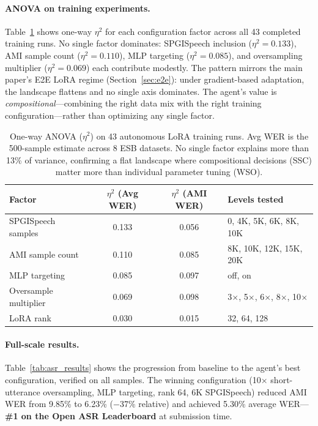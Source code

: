 \documentclass{article}
\begin{document}
\paragraph{ANOVA on training experiments.}
Table~\ref{tab:asr_anova} shows one-way $\eta^2$ for each configuration factor across all 43 completed training runs.
No single factor dominates: SPGISpeech inclusion ($\eta^2 = 0.133$), AMI sample count ($\eta^2 = 0.110$), MLP targeting ($\eta^2 = 0.085$), and oversampling multiplier ($\eta^2 = 0.069$) each contribute modestly.
The pattern mirrors the main paper's E2E LoRA regime (Section~\ref{sec:e2e}): under gradient-based adaptation, the landscape flattens and no single axis dominates.
The agent's value is \emph{compositional}---combining the right data mix with the right training configuration---rather than optimizing any single factor.

\begin{table}[ht]
\centering
\caption{One-way ANOVA ($\eta^2$) on 43 autonomous LoRA training runs. Avg WER is the 500-sample estimate across 8 ESB datasets. No single factor explains more than 13\% of variance, confirming a flat landscape where compositional decisions (SSC) matter more than individual parameter tuning (WSO).}
\label{tab:asr_anova}
\small
\begin{tabular}{@{}lccl@{}}
\toprule
Factor & $\eta^2$ (Avg WER) & $\eta^2$ (AMI WER) & Levels tested \\
\midrule
SPGISpeech samples & 0.133 & 0.056 & 0, 4K, 5K, 6K, 8K, 10K \\
AMI sample count & 0.110 & 0.085 & 8K, 10K, 12K, 15K, 20K \\
MLP targeting & 0.085 & 0.097 & off, on \\
Oversample multiplier & 0.069 & 0.098 & 3$\times$, 5$\times$, 6$\times$, 8$\times$, 10$\times$ \\
LoRA rank & 0.030 & 0.015 & 32, 64, 128 \\
\bottomrule
\end{tabular}
\end{table}

\paragraph{Full-scale results.}
Table~\ref{tab:asr_results} shows the progression from baseline to the agent's best configuration, verified on all samples.
The winning configuration (10$\times$ short-utterance oversampling, MLP targeting, rank 64, 6K SPGISpeech) reduced AMI WER from 9.85\% to 6.23\% ($-$37\% relative) and achieved 5.30\% average WER---\textbf{\#1 on the Open ASR Leaderboard} at submission time.
\end{document}
